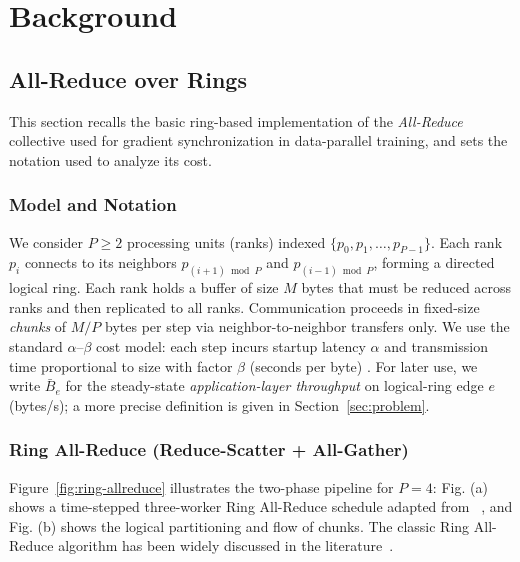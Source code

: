 \documentclass[12pt]{article}
\begin{document}
\section{Background}
\subsection{All-Reduce over Rings}
This section recalls the basic ring-based implementation of the \emph{All-Reduce} collective used for gradient synchronization in data-parallel training, and sets the notation used to analyze its cost.

\subsubsection{Model and Notation}
We consider $P\!\ge\!2$ processing units (ranks) indexed $\{p_0,p_1,\ldots,p_{P-1}\}$.
Each rank $p_i$ connects to its neighbors $p_{(i+1)\bmod P}$ and $p_{(i-1)\bmod P}$, forming a directed logical ring.
Each rank holds a buffer of size $M$ bytes that must be reduced across ranks and then replicated to all ranks.
Communication proceeds in fixed-size \emph{chunks} of $M/P$ bytes per step via neighbor-to-neighbor transfers only.
We use the standard $\alpha$–$\beta$ cost model: each step incurs startup latency $\alpha$ and transmission time proportional to size with factor $\beta$ (seconds per byte) \cite{thakur2005collectives}.
For later use, we write $\bar{B}_e$ for the steady-state \emph{application-layer throughput}
on logical-ring edge $e$ (bytes/s); a more precise definition is given in Section~\ref{sec:problem}.


\subsubsection{Ring All-Reduce (Reduce-Scatter + All-Gather)}
Figure~\ref{fig:ring-allreduce} illustrates the two-phase pipeline for $P=4$:
Fig. (a) shows a time-stepped three-worker Ring All-Reduce schedule adapted from ~\cite{yu2022scheduling}, and Fig. (b) shows the logical
partitioning and flow of chunks. The classic Ring All-Reduce algorithm has been widely discussed in the literature~\cite{thakur2005collectives,sergeev2018horovod,zong2025ibing}.
\end{document}
